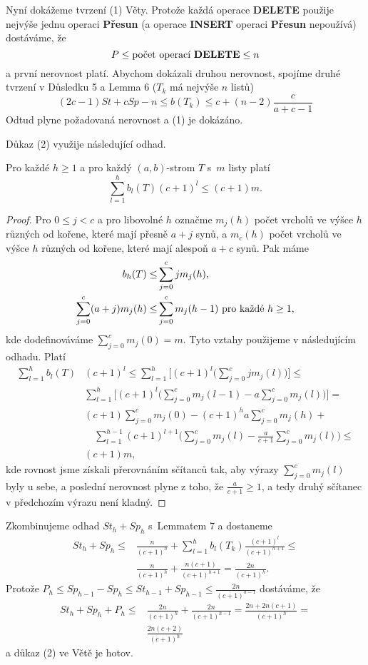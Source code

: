 \documentclass[a4paper,12pt]{article}
\begin{document}
Nyní dokážeme tvrzení (1) Věty. Protože každá operace 
{\bf DE\-LETE} použije nejvýše jednu operaci {\bf Přesun} (a operace 
{\bf INSERT} operaci {\bf Přesun} nepoužívá) dostáváme, že 
$$P\le\text{\rm počet operací {\bf DELETE}}\le n$$
a první nerovnost platí. 
Abychom dokázali druhou nerovnost, spojíme druhé 
tvrzení v Důsledku 5 a Lemma 6 ($T_k$ má nejvýše 
$n$ listů) 
$$(2c-1)St+cSp-n\le b(T_k)\le c+(n-2)\frac c{a+c-1}$$
Odtud plyne požadovaná nerovnost a (1) je dokázáno.

Důkaz (2) využije následující odhad.

\begin{lemma_counting}Pro každé $h\ge 1$ a pro každý 
$(a,b)$-strom $T$ s~$m$ listy platí 
$$\sum_{l=1}^hb_l(T)(c+1)^l\le (c+1)m.$$
\end{lemma_counting}

\begin{proof}Pro $0\le j<c$ a pro libovolné $h$ 
označme $m_j(h)$ počet vrcholů ve výšce $h$ 
různých od kořene, které mají přesně $a
+j$ 
synů, a $m_c(h)$ počet vrcholů ve výšce $
h$ 
různých od kořene, které mají alespoň $a+c$ 
synů. Pak máme
\begin{align*} b_h(T)\le&\sum_{j=0}^cjm_j(h)\text{\rm},\\
\sum_{j=0}^c(a+j)m_j(h)\le&\sum_{j=0}^cm_j(h-1)\text{\rm\ pro každé }
h\ge 1,\end{align*}
kde dodefinováváme $\sum_{j=0}^cm_j(0)=m$. Tyto vztahy 
použijeme v následujícím odhadu. Platí 
\begin{align*}\sum_{l=1}^hb_l(T)&(c+1)^l\le\sum_{l=1}^h\big[(c+1)^l\big
(\sum_{j=0}^cjm_j(l)\big)\big]\le\\
&\sum_{l=1}^h\big[(c+1)^l\big(\sum_{j=0}^cm_j(l-1)-a\sum_{j=0}^cm_
j(l)\big)\big]=\\
&(c+1)\sum_{j=0}^cm_j(0)-(c+1)^ha\sum_{j=0}^cm_j(h)+\\
&\quad\sum_{l=1}^{h-1}(c+1)^{l+1}\big(\sum_{j=0}^cm_j(l)-\frac a{
c+1}\sum_{j=0}^cm_j(l)\big)\le\\
&(c+1)m,\end{align*}
kde rovnost jsme získali přerovnáním sčítanců 
tak, aby výrazy $\sum_{j=0}^cm_j(l)$ byly u sebe, a poslední 
nerovnost plyne z toho, že $\frac a{c+1}\ge 1$, a tedy druhý sčítanec 
v předchozím výrazu není kladný.
\end{proof}
 

Zkombinujeme odhad $St_h+Sp_h$ s~Lemmatem 7 a 
dostaneme
\begin{align*} St_h+Sp_h\le&\frac n{(c+1)^h}+\sum_{l=1}^hb_l(T_k)\frac {
(c+1)^l}{(c+1)^{h+1}}\le\\
&\frac n{(c+1)^h}+\frac {n(c+1)}{(c+1)^{h+1}}=\frac {2n}{(c+1)^h}
.\end{align*}
Protože $P_h\le Sp_{h-1}-Sp_h\le St_{h-1}+Sp_{h-1}\le\frac {2n}{
(c+1)^{h-1}}$ 
dostáváme, že 
\begin{align*} St_h+Sp_h+P_h\le&\frac {2n}{(c+1)^h}+\frac {2n}{(c+1)^{h
-1}}=\frac {2n+2n(c+1)}{(c+1)^h}=\\
&\frac {2n(c+2)}{(c+1)^h}\end{align*}
a důkaz (2) ve Větě je hotov.
\end{document}
